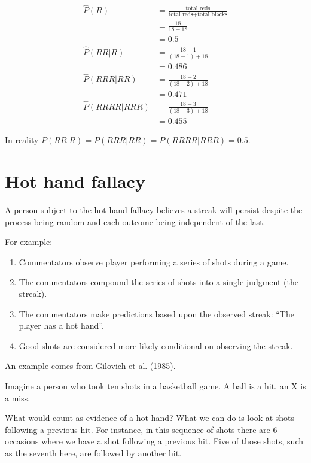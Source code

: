 \documentclass[
  letterpaper,
  DIV=11,
  numbers=noendperiod]{scrreprt}
\providecommand{\tightlist}{%
  \setlength{\itemsep}{0pt}\setlength{\parskip}{0pt}}\usepackage{longtable,booktabs,array}
\begin{document}
\begin{align*}
\hat P(R)&=\frac{\text{total reds}}{\text{total reds}+\text{total blacks}} \\
&=\frac{18}{18+18} \\
&=0.5 \\
\hat P(RR|R)&=\frac{18-1}{(18-1)+18} \\
&=0.486 \\
\hat P(RRR|RR)&=\frac{18-2}{(18-2)+18} \\
&=0.471 \\
\hat P(RRRR|RRR)&=\frac{18-3}{(18-3)+18} \\
&=0.455
\end{align*}

In reality \(P(RR|R)=P(RRR|RR)=P(RRRR|RRR)=0.5\).

\hypertarget{hot-hand-fallacy}{%
\section{Hot hand fallacy}\label{hot-hand-fallacy}}

A person subject to the hot hand fallacy believes a streak will persist
despite the process being random and each outcome being independent of
the last.

For example:

\begin{enumerate}
\def\labelenumi{\arabic{enumi}.}
\tightlist
\item
  Commentators observe player performing a series of shots during a
  game.
\item
  The commentators compound the series of shots into a single judgment
  (the streak).
\item
  The commentators make predictions based upon the observed streak:
  ``The player has a hot hand''.
\item
  Good shots are considered more likely conditional on observing the
  streak.
\end{enumerate}

An example comes from Gilovich et al. (1985).

Imagine a person who took ten shots in a basketball game. A ball is a
hit, an X is a miss.

What would count as evidence of a hot hand? What we can do is look at
shots following a previous hit. For instance, in this sequence of shots
there are 6 occasions where we have a shot following a previous hit.
Five of those shots, such as the seventh here, are followed by another
hit.
\end{document}
